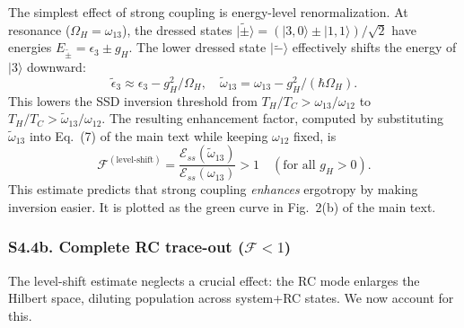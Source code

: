\documentclass[prl,twocolumn,superscriptaddress,amsmath,amssymb]{revtex4-2}
\begin{document}
The simplest effect of strong coupling is energy-level renormalization. At resonance ($\Omega_H = \omega_{13}$), the dressed states $|\tilde\pm\rangle = (|3,0\rangle \pm |1,1\rangle)/\sqrt{2}$ have energies $E_{\tilde\pm} = \epsilon_3 \pm g_H$. The lower dressed state $|\tilde-\rangle$ effectively shifts the energy of $|3\rangle$ downward:
\begin{equation}\label{eq:S16a}
\tilde\epsilon_3 \approx \epsilon_3 - g_H^2/\Omega_H, \quad \tilde\omega_{13} = \omega_{13} - g_H^2/(\hbar\Omega_H).
\end{equation}
This lowers the SSD inversion threshold from $T_H/T_C > \omega_{13}/\omega_{12}$ to $T_H/T_C > \tilde\omega_{13}/\omega_{12}$. The resulting enhancement factor, computed by substituting $\tilde\omega_{13}$ into Eq.~(7) of the main text while keeping $\omega_{12}$ fixed, is
\begin{equation}\label{eq:S16a-F}
\mathcal{F}^{(\mathrm{level\text{-}shift})} = \frac{\mathcal{E}_{ss}(\tilde\omega_{13})}{\mathcal{E}_{ss}(\omega_{13})} > 1 \quad (\text{for all } g_H > 0).
\end{equation}
This estimate predicts that strong coupling \emph{enhances} ergotropy by making inversion easier. It is plotted as the green curve in Fig.~2(b) of the main text.

\subsubsection{S4.4b. Complete RC trace-out ($\mathcal{F} < 1$)}

The level-shift estimate neglects a crucial effect: the RC mode enlarges the Hilbert space, diluting population across system+RC states. We now account for this.
\end{document}
